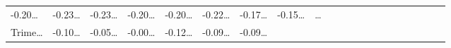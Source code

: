 \documentclass[
]{article}
\begin{document}
\begin{longtable}[]{@{}lllllllllllllllllllll@{}}
\begin{minipage}[t]{0.03\columnwidth}
-0.20\ldots{}\strut
\end{minipage} & \begin{minipage}[t]{0.03\columnwidth}\raggedright
-0.23\ldots{}\strut
\end{minipage} & \begin{minipage}[t]{0.03\columnwidth}\raggedright
-0.23\ldots{}\strut
\end{minipage} & \begin{minipage}[t]{0.03\columnwidth}\raggedright
-0.20\ldots{}\strut
\end{minipage} & \begin{minipage}[t]{0.03\columnwidth}\raggedright
-0.20\ldots{}\strut
\end{minipage} & \begin{minipage}[t]{0.03\columnwidth}\raggedright
-0.22\ldots{}\strut
\end{minipage} & \begin{minipage}[t]{0.03\columnwidth}\raggedright
-0.17\ldots{}\strut
\end{minipage} & \begin{minipage}[t]{0.03\columnwidth}\raggedright
-0.15\ldots{}\strut
\end{minipage} & \begin{minipage}[t]{0.01\columnwidth}\raggedright
\ldots{}\strut
\end{minipage}\tabularnewline
\begin{minipage}[t]{0.03\columnwidth}\raggedright
Trime\ldots{}\strut
\end{minipage} & \begin{minipage}[t]{0.03\columnwidth}\raggedright
-0.10\ldots{}\strut
\end{minipage} & \begin{minipage}[t]{0.03\columnwidth}\raggedright
-0.05\ldots{}\strut
\end{minipage} & \begin{minipage}[t]{0.03\columnwidth}\raggedright
-0.00\ldots{}\strut
\end{minipage} & \begin{minipage}[t]{0.03\columnwidth}\raggedright
-0.12\ldots{}\strut
\end{minipage} & \begin{minipage}[t]{0.03\columnwidth}\raggedright
-0.09\ldots{}\strut
\end{minipage} & \begin{minipage}[t]{0.03\columnwidth}\raggedright
-0.09\ldots{}\strut
\end{minipage} & \begin{minipage}[t]{0.03\columnwidth}\raggedright

\end{minipage}
\end{longtable}
\end{document}

